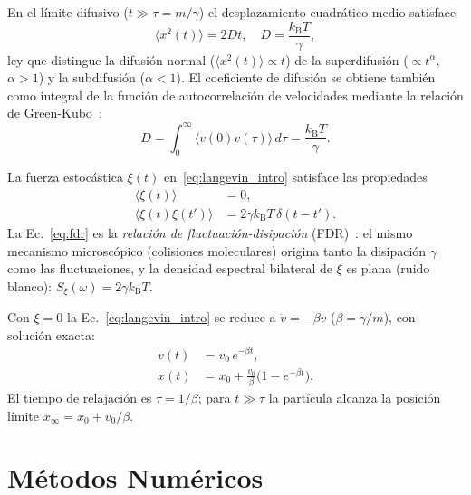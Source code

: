 \documentclass[aps,prl,twocolumn,showpacs,superscriptaddress,longbibliography]{revtex4-2}
\newcommand{\kB}{k_{\mathrm{B}}}
\newcommand{\mean}[1]{\langle #1 \rangle}
\newcommand{\MSD}{\langle x^2(t) \rangle}
\begin{document}
	En el límite difusivo ($t\gg\tau{=}m/\gamma$) el desplazamiento cuadrático
	medio satisface~\cite{Einstein1905}
	\begin{equation}
		\MSD = 2Dt, \quad D = \frac{\kB T}{\gamma},
		\label{eq:msd}
	\end{equation}
	ley que distingue la difusión normal ($\MSD\propto t$) de la superdifusión
	($\propto t^\alpha$, $\alpha>1$) y la subdifusión ($\alpha<1$).
	El coeficiente de difusión se obtiene también como integral de la
	función de autocorrelación de velocidades mediante la relación de
	Green-Kubo~\cite{Uhlenbeck1930}:
	\begin{equation}
		D = \int_0^\infty \mean{v(0)v(\tau)}\,d\tau = \frac{\kB T}{\gamma}.
		\label{eq:green_kubo}
	\end{equation}
	
	La fuerza estocástica $\xi(t)$ en~\eqref{eq:langevin_intro} satisface
	las propiedades~\cite{Uhlenbeck1930}
	\begin{subequations}
		\label{eq:ruido}
		\begin{align}
			\mean{\xi(t)}       &= 0, \\
			\mean{\xi(t)\xi(t')} &= 2\gamma\kB T\,\delta(t-t').
			\label{eq:fdr}
		\end{align}
	\end{subequations}
	La Ec.~\eqref{eq:fdr} es la \textit{relación de fluctuación-disipación}
	(FDR)~\cite{Callen1951}: el mismo mecanismo microscópico (colisiones
	moleculares) origina tanto la disipación $\gamma$ como las fluctuaciones,
	y la densidad espectral bilateral de $\xi$ es plana (ruido blanco):
	$S_\xi(\omega)=2\gamma\kB T$.
	
	Con $\xi=0$ la Ec.~\eqref{eq:langevin_intro} se reduce a
	$\dot{v}=-\beta v$ ($\beta=\gamma/m$), con solución exacta:
	\begin{subequations}
		\label{eq:sol_exacta}
		\begin{align}
			v(t) &= v_0\,e^{-\beta t}, \label{eq:sol_v}\\
			x(t) &= x_0 + \frac{v_0}{\beta}\bigl(1-e^{-\beta t}\bigr).
			\label{eq:sol_x}
		\end{align}
	\end{subequations}
	El tiempo de relajación es $\tau=1/\beta$; para $t\gg\tau$ la partícula
	alcanza la posición límite $x_\infty=x_0+v_0/\beta$.
	
	\section{Métodos Numéricos}
	\label{sec:metodos}
	
\end{document}
